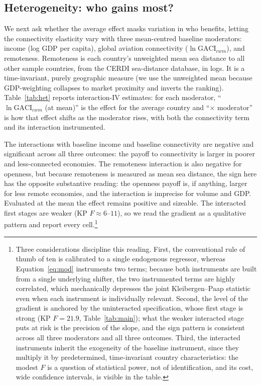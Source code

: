 \subsection{Heterogeneity: who gains most?}

We next ask whether the average effect masks variation in who benefits, letting
the connectivity elasticity vary with three mean-centred baseline moderators:
income (log GDP per capita), global aviation connectivity ($\ln\mathrm{GACI}_{cwm}$),
and remoteness. Remoteness is each country's unweighted mean sea distance to all
other sample countries, from the CERDI sea-distance database, in logs. It is a
time-invariant, purely geographic measure (we use the unweighted mean because
GDP-weighting collapses to market proximity and inverts the ranking).
Table~\ref{tab:het} reports interaction-IV estimates: for each moderator,
``$\ln\mathrm{GACI}_{cwm}$ (at mean)'' is the effect for the average country and
``$\times$ moderator'' is how that effect shifts as the moderator rises, with both
the connectivity term and its interaction instrumented.

The interactions with baseline income and baseline connectivity are negative and
significant across all three outcomes: the payoff to connectivity is larger in
poorer and less-connected economies. The remoteness interaction is also negative
for openness, but because remoteness is measured as mean sea distance, the sign
here has the opposite substantive reading: the openness payoff is, if anything,
larger for less remote economies, and the interaction is imprecise for volume
and GDP. Evaluated at the mean the effect remains positive and sizeable. The
interacted first stages are weaker (KP $F\approx6$--$11$), so we read the gradient
as a qualitative pattern and report every cell.\footnote{Three considerations
discipline this reading. First, the conventional rule of thumb of ten is
calibrated to a single endogenous regressor, whereas
Equation~\eqref{eq:mod} instruments two terms; because both instruments are
built from a single underlying shifter, the two instrumented terms are highly
correlated, which mechanically depresses the joint Kleibergen--Paap statistic
even when each instrument is individually relevant. Second, the level of the
gradient is anchored by the uninteracted specification, whose first stage is
strong (KP $F=21.9$, Table~\ref{tab:main}); what the weaker interacted stage
puts at risk is the precision of the slope, and the sign pattern is consistent
across all three moderators and all three outcomes. Third, the interacted
instruments inherit the exogeneity of the baseline instrument, since they
multiply it by predetermined, time-invariant country characteristics: the
modest $F$ is a question of statistical power, not of identification, and its
cost, wide confidence intervals, is visible in the table.}

